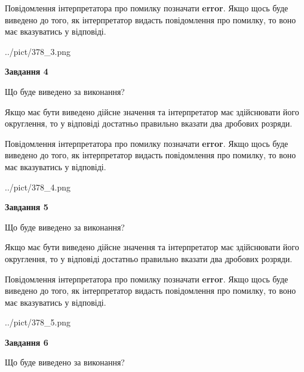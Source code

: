 \documentclass[12pt, ukrainian]{article}
\begin{document}
{\begin {Large}
Повідомлення інтерпретатора про помилку позначати \textbf{error}.
Якщо щось буде виведено до того, як інтерпретатор видасть повідомлення про помилку, 
то воно має вказуватись у відповіді. \par

\begin{center}
	{../pict/378_3.png}
\end{center}
\newpage

{\begin {center}\textbf{Завдання 4}\end {center}}\par
Що буде виведено за виконання? \par

Якщо має бути виведено дійсне значення та інтерпретатор має здійснювати його округлення, 
то у відповіді достатньо правильно вказати два дробових розряди.

Повідомлення інтерпретатора про помилку позначати \textbf{error}.
Якщо щось буде виведено до того, як інтерпретатор видасть повідомлення про помилку, 
то воно має вказуватись у відповіді. \par

\begin{center}
	{../pict/378_4.png}
\end{center}
\newpage

{\begin {center}\textbf{Завдання 5}\end {center}}\par
Що буде виведено за виконання? \par

Якщо має бути виведено дійсне значення та інтерпретатор має здійснювати його округлення, 
то у відповіді достатньо правильно вказати два дробових розряди.

Повідомлення інтерпретатора про помилку позначати \textbf{error}.
Якщо щось буде виведено до того, як інтерпретатор видасть повідомлення про помилку, 
то воно має вказуватись у відповіді. \par

\begin{center}
	{../pict/378_5.png}
\end{center}
\newpage

{\begin {center}\textbf{Завдання 6}\end {center}}\par
Що буде виведено за виконання? \par


\end{Large}}
\end{document}
